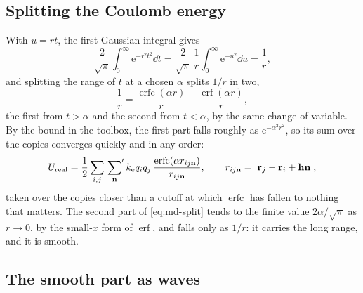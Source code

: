 \subsection*{Splitting the Coulomb energy}

With $u = rt$, the first Gaussian integral gives
\begin{equation*}
   \frac{2}{\sqrt\pi}\int_0^{\infty}\mathrm{e}^{-r^2t^2}\dd t
   = \frac{2}{\sqrt\pi}\,\frac1r\int_0^{\infty}\mathrm{e}^{-u^2}\dd u
   = \frac1r ,
\end{equation*}
and splitting the range of $t$ at a chosen $\alpha$ splits $1/r$ in two,
\begin{equation}
   \frac1r = \frac{\operatorname{erfc}(\alpha r)}{r}
   + \frac{\operatorname{erf}(\alpha r)}{r} ,
   \label{eq:md-split}
\end{equation}
the first from $t > \alpha$ and the second from $t < \alpha$, by the same
change of variable. By the bound in the toolbox, the first part falls
roughly as $\mathrm{e}^{-\alpha^2r^2}$, so its sum over the copies
converges quickly and in any order:
\begin{equation*}
   U_{\mathrm{real}} = \frac12\sum_{i,j}\sideset{}{'}\sum_{\bm{\mathrm{n}}}k_{\mathrm e}
   q_iq_j\,\frac{\operatorname{erfc}(\alpha r_{ij\bm{\mathrm{n}}})}{r_{ij\bm{\mathrm{n}}}} ,
   \qquad r_{ij\bm{\mathrm{n}}} = \lvert\bm{\mathrm{r}}_j - \bm{\mathrm{r}}_i + \bm{\mathrm{h}}\bm{\mathrm{n}}\rvert ,
\end{equation*}
taken over the copies closer than a cutoff at which $\operatorname{erfc}$
has fallen to nothing that matters. The second part of \cref{eq:md-split}
tends to the finite value $2\alpha/\sqrt\pi$ as $r \to 0$, by the
small-$x$ form of $\operatorname{erf}$, and falls only as $1/r$: it
carries the long range, and it is smooth.

\subsection*{The smooth part as waves}

